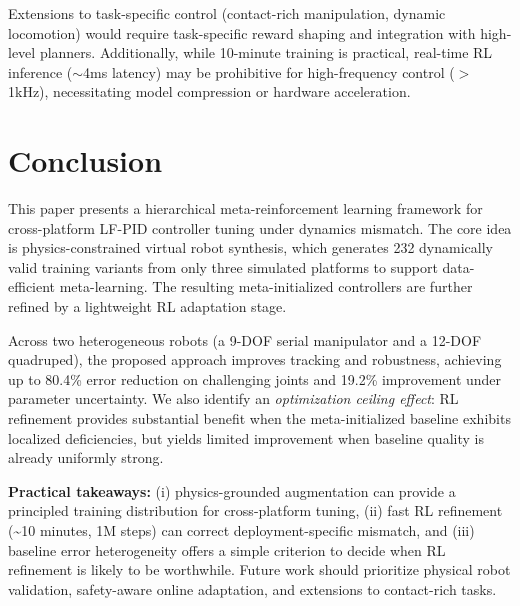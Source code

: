 \documentclass[DTMColor]{ROB-New}
\begin{document}
Extensions to task-specific control (contact-rich manipulation, dynamic locomotion) would require task-specific reward shaping and integration with high-level planners. Additionally, while 10-minute training is practical, real-time RL inference ($\sim$4ms latency) may be prohibitive for high-frequency control ($>$1kHz), necessitating model compression or hardware acceleration.

\section{Conclusion}
\label{sec:conclusion}

This paper presents a hierarchical meta-reinforcement learning framework for cross-platform LF-PID controller tuning under dynamics mismatch. The core idea is physics-constrained virtual robot synthesis, which generates 232 dynamically valid training variants from only three simulated platforms to support data-efficient meta-learning. The resulting meta-initialized controllers are further refined by a lightweight RL adaptation stage.

Across two heterogeneous robots (a 9-DOF serial manipulator and a 12-DOF quadruped), the proposed approach improves tracking and robustness, achieving up to 80.4\% error reduction on challenging joints and 19.2\% improvement under parameter uncertainty. We also identify an \textit{optimization ceiling effect}: RL refinement provides substantial benefit when the meta-initialized baseline exhibits localized deficiencies, but yields limited improvement when baseline quality is already uniformly strong.

            	\textbf{Practical takeaways:} (i) physics-grounded augmentation can provide a principled training distribution for cross-platform tuning, (ii) fast RL refinement (\textasciitilde10 minutes, 1M steps) can correct deployment-specific mismatch, and (iii) baseline error heterogeneity offers a simple criterion to decide when RL refinement is likely to be worthwhile. Future work should prioritize physical robot validation, safety-aware online adaptation, and extensions to contact-rich tasks.

\end{document}
